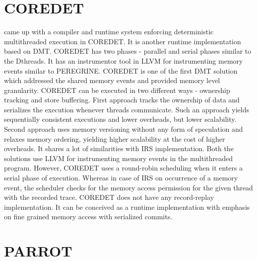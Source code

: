 \section{COREDET}

\citet{coredet} came up with a compiler and runtime system enforcing deterministic multithreaded execution in COREDET. 
It is another runtime implementation based on DMT. 
COREDET has two phases - parallel and serial phases similar to the Dthreads. 
It has an instrumentor tool in LLVM for instrumenting memory events similar to PEREGRINE. 
COREDET is one of the first DMT solution which addressed the shared memory events and provided memory level granularity. 
COREDET can be executed in two different ways - ownership tracking and store buffering. 
First approach tracks the ownership of data and serializes the execution whenever threads communicate. Such an approach yields sequentially consistent executions and lower overheads, but lower scalability. 
Second approach uses memory versioning without any form of speculation and relaxes memory ordering, yielding higher scalability at the cost of higher overheads.  
It shares a lot of similarities with IRS implementation. 
Both the solutions use LLVM for instrumenting memory events in the multithreaded program. 
However, COREDET uses a round-robin scheduling when it enters a serial phase of execution. 
Whereas in case of IRS on occurrence of a memory event, the scheduler checks for the memory access permission for the given thread with the recorded trace. 
COREDET does not have any record-replay implementation. 
It can be conceived as a runtime implementation with emphasis on fine grained memory access with serialized commits.  


\section{PARROT}

